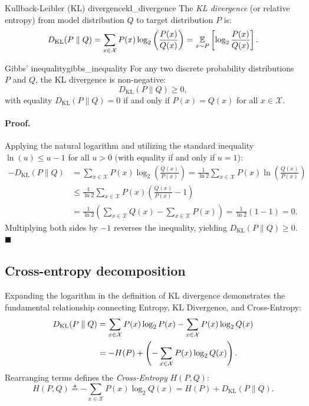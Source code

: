 \documentclass[../../main.tex]{subfiles}
\begin{document}
\begin{definition}{Kullback-Leibler (KL) divergence}{kl_divergence}
The \emph{KL divergence} (or relative entropy) from model distribution $Q$ to target distribution $P$ is:
\begin{equation}
\label{eq:kl_divergence}
D_{\text{KL}}(P \parallel Q) = \sum_{x \in \mathcal{X}} P(x) \log_2 \left( \frac{P(x)}{Q(x)} \right) = \operatorname*{\mathbb{E}}_{x \sim P}\left[ \log_2 \frac{P(x)}{Q(x)} \right].
\end{equation}
\end{definition}

\begin{theorem}{Gibbs' inequality}{gibbs_inequality}
For any two discrete probability distributions $P$ and $Q$, the KL divergence is non-negative:
\begin{equation}
\label{eq:gibbs_ineq}
D_{\text{KL}}(P \parallel Q) \ge 0,
\end{equation}
with equality $D_{\text{KL}}(P \parallel Q) = 0$ if and only if $P(x) = Q(x)$ for all $x \in \mathcal{X}$.
\end{theorem}

\paragraph{Proof.}
Applying the natural logarithm and utilizing the standard inequality $\ln(u) \le u - 1$ for all $u > 0$ (with equality if and only if $u = 1$):
\begin{align*}
- D_{\text{KL}}(P \parallel Q) &= \sum_{x \in \mathcal{X}} P(x) \log_2 \left( \frac{Q(x)}{P(x)} \right) = \frac{1}{\ln 2} \sum_{x \in \mathcal{X}} P(x) \ln \left( \frac{Q(x)}{P(x)} \right) \\
&\le \frac{1}{\ln 2} \sum_{x \in \mathcal{X}} P(x) \left( \frac{Q(x)}{P(x)} - 1 \right) \\
&= \frac{1}{\ln 2} \left( \sum_{x \in \mathcal{X}} Q(x) - \sum_{x \in \mathcal{X}} P(x) \right) = \frac{1}{\ln 2} (1 - 1) = 0.
\end{align*}
Multiplying both sides by $-1$ reverses the inequality, yielding $D_{\text{KL}}(P \parallel Q) \ge 0$. \hfill $\blacksquare$

\subsection{Cross-entropy decomposition}
Expanding the logarithm in the definition of KL divergence demonstrates the fundamental relationship connecting Entropy, KL Divergence, and Cross-Entropy:
\begin{align}
D_{\text{KL}}(P \parallel Q) &= \sum_{x \in \mathcal{X}} P(x) \log_2 P(x) - \sum_{x \in \mathcal{X}} P(x) \log_2 Q(x) \notag \\
&= - H(P) + \left( - \sum_{x \in \mathcal{X}} P(x) \log_2 Q(x) \right). \label{eq:kl_expanded}
\end{align}
Rearranging terms defines the \emph{Cross-Entropy} $H(P, Q)$:
\begin{equation}
\label{eq:cross_entropy_decomp}
H(P, Q) \triangleq - \sum_{x \in \mathcal{X}} P(x) \log_2 Q(x) = H(P) + D_{\text{KL}}(P \parallel Q).
\end{equation}
\end{document}

